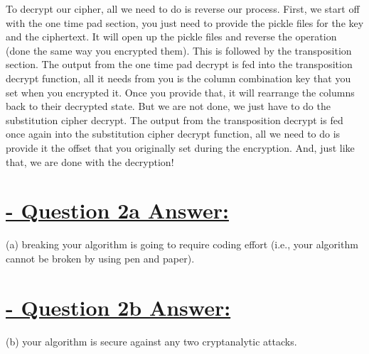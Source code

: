 \documentclass{article}
\begin{document}
\newline
To decrypt our cipher, all we need to do is reverse our process. First, we start off with the one time pad section, you just need to provide the pickle files for the key and the ciphertext. It will open up the pickle files and reverse the operation (done the same way you encrypted them). This is followed by the transposition section. The output from the one time pad decrypt is fed into the transposition decrypt function, all it needs from you is the column combination key that you set when you encrypted it. Once you provide that, it will rearrange the columns back to their decrypted state. But we are not done, we just have to do the substitution cipher decrypt. The output from the transposition decrypt is fed once again into the substitution cipher decrypt function, all we need to do is provide it the offset that you originally set during the encryption. And, just like that, we are done with the decryption!




\section{\underline{ - Question 2a Answer:}}
(a) breaking your algorithm is going to require coding effort (i.e., your algorithm cannot be broken by
using pen and paper).

\section{\underline{ - Question 2b Answer:}}
(b) your algorithm is secure against any two cryptanalytic attacks.
\end{document}
